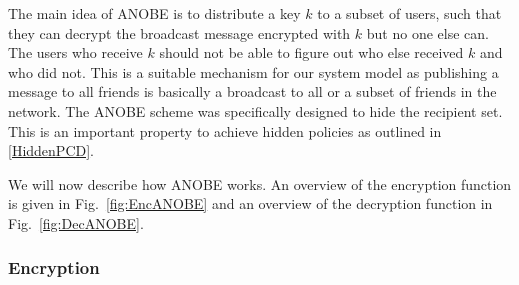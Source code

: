 
The main idea of \ac{ANOBE} is to distribute a key \(k\) to a subset of users, 
such that they can decrypt the broadcast message encrypted with \(k\) but no 
one else can.
The users who receive \(k\) should not be able to figure out who else received 
\(k\) and who did not.
This is a suitable mechanism for our system model as publishing a message to 
all friends is basically a broadcast to all or a subset of friends in the 
network.
The \ac{ANOBE} scheme was specifically designed to hide the recipient set.
This is an important property to achieve hidden policies as outlined in 
\cref{HiddenPCD}.

We will now describe how \ac{ANOBE} works.
An overview of the encryption function is given in Fig.~\ref{fig:EncANOBE} and 
an overview of the decryption function in Fig.~\ref{fig:DecANOBE}.

\subsubsection<article>{Encryption}

